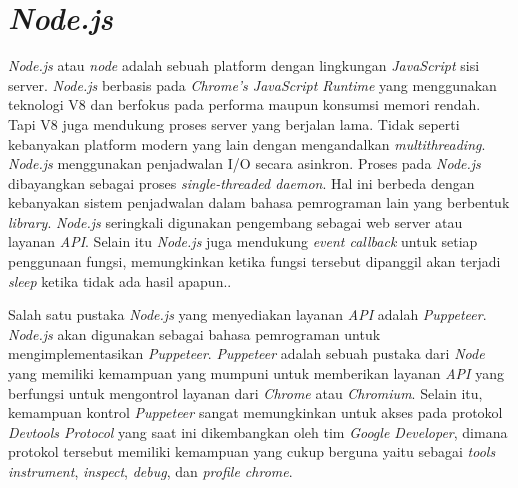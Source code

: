 	\section{\textit{Node.js}}
		\textit{Node.js} atau \textit{node} adalah sebuah platform dengan lingkungan \textit{JavaScript} sisi server.\textit{ Node.js} berbasis pada \textit{Chrome's JavaScript Runtime} yang menggunakan teknologi V8 dan berfokus pada performa maupun konsumsi memori rendah. Tapi V8 juga mendukung proses server yang berjalan lama. Tidak seperti kebanyakan platform modern yang lain dengan mengandalkan \textit{multithreading}. \textit{Node.js} menggunakan penjadwalan I/O secara asinkron. Proses pada \textit{Node.js} dibayangkan sebagai proses \textit{single-threaded daemon}. Hal ini berbeda dengan kebanyakan sistem penjadwalan dalam bahasa pemrograman lain yang berbentuk \textit{library}. \textit{Node.js} seringkali digunakan pengembang sebagai web server atau layanan \textit{API}. Selain itu \textit{Node.js} juga mendukung \textit{event callback} untuk setiap penggunaan fungsi, memungkinkan ketika fungsi tersebut dipanggil akan terjadi \textit{sleep} ketika tidak ada hasil apapun.\cite{nodejs}\cite{nodejs_2}.
		
	 	\indent Salah satu pustaka \textit{Node.js} yang menyediakan layanan \textit{API} adalah \textit{Puppeteer}. \textit{Node.js} akan digunakan sebagai bahasa pemrograman untuk mengimplementasikan \textit{Puppeteer}. \textit{Puppeteer} adalah sebuah pustaka dari \textit{Node} yang memiliki kemampuan yang mumpuni untuk memberikan layanan \textit{API} yang berfungsi untuk mengontrol layanan dari \textit{Chrome} atau \textit{Chromium}. Selain itu, kemampuan kontrol \textit{Puppeteer} sangat memungkinkan untuk akses pada protokol \textit{Devtools Protocol} yang saat ini dikembangkan oleh tim \textit{Google Developer}, dimana protokol tersebut memiliki kemampuan yang cukup berguna yaitu sebagai \textit{tools instrument}, \textit{inspect}, \textit{debug}, dan \textit{profile chrome}\cite{puppeteer}.
	 	
